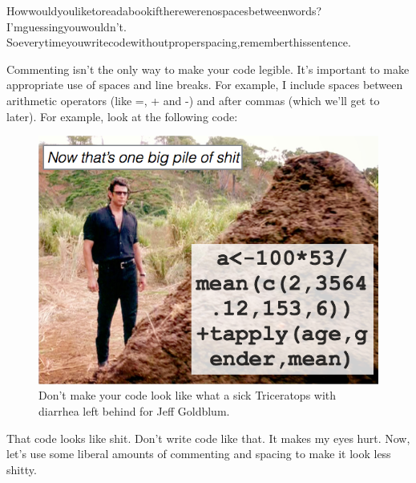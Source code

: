 \documentclass[]{book}
\newenvironment{Shaded}{\begin{snugshade}}{\end{snugshade}}
\newcommand{\KeywordTok}[1]{\textcolor[rgb]{0.13,0.29,0.53}{\textbf{{#1}}}}
\newcommand{\DataTypeTok}[1]{\textcolor[rgb]{0.13,0.29,0.53}{{#1}}}
\newcommand{\DecValTok}[1]{\textcolor[rgb]{0.00,0.00,0.81}{{#1}}}
\newcommand{\FloatTok}[1]{\textcolor[rgb]{0.00,0.00,0.81}{{#1}}}
\newcommand{\StringTok}[1]{\textcolor[rgb]{0.31,0.60,0.02}{{#1}}}
\newcommand{\CommentTok}[1]{\textcolor[rgb]{0.56,0.35,0.01}{\textit{{#1}}}}
\newcommand{\NormalTok}[1]{{#1}}
\theoremstyle{definition}
\theoremstyle{definition}
\theoremstyle{remark}
\begin{document}
Howwouldyouliketoreadabookiftherewerenospacesbetweenwords?
I'mguessingyouwouldn't.
Soeverytimeyouwritecodewithoutproperspacing,rememberthissentence.

Commenting isn't the only way to make your code legible. It's important
to make appropriate use of spaces and line breaks. For example, I
include spaces between arithmetic operators (like =, + and -) and after
commas (which we'll get to later). For example, look at the following
code:

\begin{figure}

{\centering \includegraphics[width=0.5\linewidth]{images/pileofshit} 

}

\caption{Don't make your code look like what a sick Triceratops with diarrhea left behind for Jeff Goldblum.}\label{fig:pileofshit}
\end{figure}

\begin{Shaded}
\end{Shaded}

That code looks like shit. Don't write code like that. It makes my eyes
hurt. Now, let's use some liberal amounts of commenting and spacing to
make it look less shitty.
\end{document}
